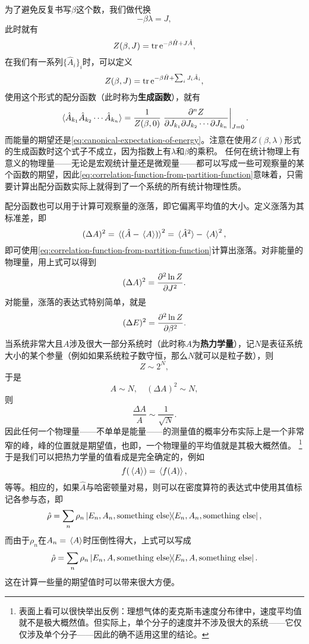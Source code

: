\documentclass[hyperref, UTF8, a4paper]{ctexart}
\newcommand*{\ee}{\mathrm{e}}
\begin{document}
为了避免反复书写$\beta$这个数，我们做代换
\[
    - \beta \lambda = J,
\]
此时就有
\begin{equation}
    Z(\beta, J) = \trace \ee^{-\beta \hat{H} + J \hat{A}},
\end{equation}
在我们有一系列$\{\hat{A}_i\}_i$时，可以定义
\begin{equation}
    Z(\beta, J) = \trace \ee^{-\beta \hat{H} + \sum_i J_i \hat{A}_i },
\end{equation}
使用这个形式的配分函数（此时称为\textbf{生成函数}），就有
\begin{equation}
    \expval*{\hat{A}_{k_1} \hat{A}_{k_2} \cdots \hat{A}_{k_n}} = \frac{1}{Z(\beta,0)} \eval{\frac{\partial^n Z}{\partial J_{k_1} \partial J_{k_2} \cdots \partial J_{k_n}}}_{J=0}.
    \label{eq:correlation-function-from-partition-function}
\end{equation}
而能量的期望还是\eqref{eq:canonical-expectation-of-energy}。注意在使用$Z(\beta, \lambda)$形式的生成函数时这个式子不成立，因为指数上有$\lambda$和$\beta$的乘积。
任何在统计物理上有意义的物理量——无论是宏观统计量还是微观量——都可以写成一些可观察量的某个函数的期望，因此\eqref{eq:correlation-function-from-partition-function}意味着，只需要计算出配分函数实际上就得到了一个系统的所有统计物理性质。

配分函数也可以用于计算可观察量的涨落，即它偏离平均值的大小。定义涨落为其标准差，即
\begin{equation}
    (\Delta A)^2 = \expval*{(\hat{A} - \expval*{A})}^2 = \expval*{\hat{A}^2} - \expval*{A}^2,
\end{equation}
即可使用\eqref{eq:correlation-function-from-partition-function}计算出涨落。对非能量的物理量，用上式可以得到
\begin{equation}
    (\Delta A)^2 = \pdv[2]{\ln Z}{J}.
\end{equation}
对能量，涨落的表达式特别简单，就是
\begin{equation}
    (\Delta E)^2 = \pdv[2]{\ln Z}{\beta}.
\end{equation}
当系统非常大且$A$涉及很大一部分系统时（此时称$A$为\textbf{热力学量}），记$N$是表征系统大小的某个参量（例如如果系统粒子数守恒，那么$N$就可以是粒子数），则
\[
    Z \sim 2^N,
\]
于是
\[
    A \sim N, \quad (\Delta A)^2 \sim N,
\]
则
\[
    \frac{\Delta A}{A} \sim \frac{1}{\sqrt{N}}.
\]
因此任何一个物理量——不单单是能量——的测量值的概率分布实际上是一个非常窄的峰，峰的位置就是期望值，也即，一个物理量的平均值就是其极大概然值。%
\footnote{表面上看可以很快举出反例：理想气体的麦克斯韦速度分布律中，速度平均值就不是极大概然值。但实际上，单个分子的速度并不涉及很大的系统——它仅仅涉及单个分子——因此的确不适用这里的结论。
}%
于是我们可以把热力学量的值看成是完全确定的，例如
\[
    f(\expval*{A}) = \expval*{f(A)},
\]
等等。相应的，如果$\hat{A}$与哈密顿量对易，则可以在密度算符的表达式中使用其值标记各参与态，即
\[
    \hat{\rho} = \sum_n \rho_n \dyad{E_n, A_n, \text{something else}},
\]
而由于$\rho_n$在$A_n = \expval*{A}$时压倒性得大，上式可以写成
\[
    \hat{\rho} = \sum_n \rho_n \dyad{E_n, A, \text{something else}}.
\]
这在计算一些量的期望值时可以带来很大方便。
\end{document}
